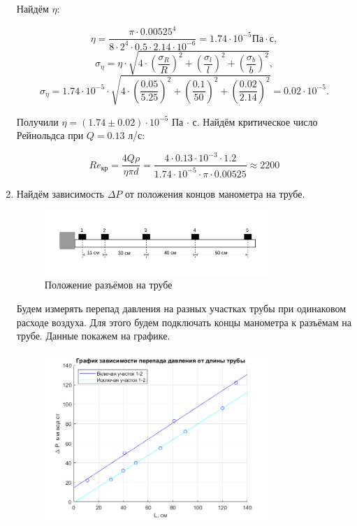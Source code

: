 \documentclass[a4paper,12pt]{article}
\begin{document}
\begin{enumerate}
Найдём $\eta$:

\[
\eta = \dfrac{\pi \cdot 0.00525 ^ 4}{8 \cdot 2^4 \cdot 0.5 \cdot 2.14 \cdot 10^{-6}} = 1.74 \cdot 10^{-5} \text{Па} \cdot \text{с},
\]
\[
\sigma_\eta = \eta \cdot \sqrt{4 \cdot \left( \frac{\sigma_R}{R} \right) ^ 2 + \left( \frac{\sigma_l}{l} \right) ^ 2 + \left( \frac{\sigma_b}{b} \right) ^ 2}, 
\]\[
\sigma_\eta = 1.74 \cdot 10^{-5} \cdot \sqrt{4 \cdot \left(\frac{0.05}{5.25} \right) ^ 2 + \left( \frac{0.1}{50} \right) ^ 2 + \left( \frac{0.02}{2.14} \right) ^ 2} = 0.02 \cdot 10 ^ {-5}.
\]

Получили $\eta = (1.74 \pm 0.02) \cdot 10^{-5}$ Па $\cdot$ с.
Найдём критическое число Рейнольдса при $Q = 0.13$ л/с:

\[
Re_\text{кр} = \frac{4 Q \rho}{\eta \pi d} = \frac{4 \cdot 0.13 \cdot 10^{-3} \cdot 1.2}{1.74 \cdot 10^{-5} \cdot \pi \cdot 0.00525} \approx 2200
\] 

\item Найдём зависимость $\Delta P$ от положения концов манометра на трубе.

\begin{figure}[h!]
\centering
\includegraphics[width=0.8\textwidth]{setup2.jpg}
\caption{Положение разъёмов на трубе}
\label{setup2}
\end{figure}

Будем измерять перепад давления на разных участках трубы при одинаковом расходе воздуха. Для этого будем подключать концы манометра к разъёмам на трубе. Данные покажем на графике.

\begin{figure}[h!]
\centering
\includegraphics[width=0.8\textwidth]{plot_3.png}
\label{setup2}
\end{figure}
\end{enumerate}
\end{document}
